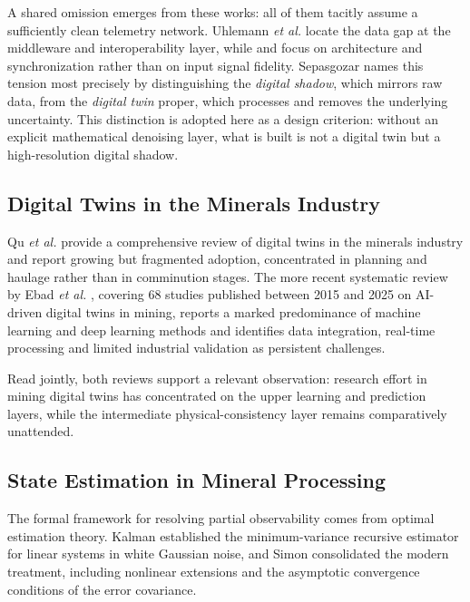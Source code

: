 \documentclass[conference]{IEEEtran}
\begin{document}
A shared omission emerges from these works: all of them tacitly assume a
sufficiently clean telemetry network. Uhlemann \textit{et al.}
\cite{uhlemann2017} locate the data gap at the middleware and interoperability
layer, while \cite{tao2019} and \cite{fuller2020} focus on architecture and
synchronization rather than on input signal fidelity. Sepasgozar
\cite{sepasgozar2021} names this tension most precisely by distinguishing the
\textit{digital shadow}, which mirrors raw data, from the \textit{digital twin}
proper, which processes and removes the underlying uncertainty. This
distinction is adopted here as a design criterion: without an explicit
mathematical denoising layer, what is built is not a digital twin but a
high-resolution digital shadow.

\subsection{Digital Twins in the Minerals Industry}

Qu \textit{et al.} \cite{qu2023} provide a comprehensive review of digital twins
in the minerals industry and report growing but fragmented adoption,
concentrated in planning and haulage rather than in comminution stages. The more
recent systematic review by Ebad \textit{et al.} \cite{ebad2026}, covering 68
studies published between 2015 and 2025 on AI-driven digital twins in mining,
reports a marked predominance of machine learning and deep learning methods and
identifies data integration, real-time processing and limited industrial
validation as persistent challenges.

Read jointly, both reviews support a relevant observation: research effort in
mining digital twins has concentrated on the upper learning and prediction
layers, while the intermediate physical-consistency layer remains comparatively
unattended.

\subsection{State Estimation in Mineral Processing}

The formal framework for resolving partial observability comes from optimal
estimation theory. Kalman \cite{kalman1960} established the minimum-variance
recursive estimator for linear systems in white Gaussian noise, and Simon
\cite{simon2006} consolidated the modern treatment, including nonlinear
extensions and the asymptotic convergence conditions of the error covariance.
\end{document}
